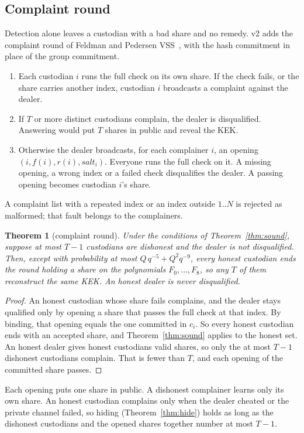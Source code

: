 \documentclass[10pt,a4paper]{article}
\newtheorem{theorem}{Theorem}
\theoremstyle{definition}
\theoremstyle{remark}
\begin{document}
\subsection{Complaint round}\label{sec:complaint}
Detection alone leaves a custodian with a bad share and no remedy. v2 adds the complaint round of Feldman and Pedersen VSS~\cite{feldman,pedersen}, with the hash commitment in place of the group commitment.
\begin{enumerate}
  \item Each custodian $i$ runs the full check on its own share. If the check fails, or the share carries another index, custodian $i$ broadcasts a complaint against the dealer.
  \item If $T$ or more distinct custodians complain, the dealer is disqualified. Answering would put $T$ shares in public and reveal the KEK.
  \item Otherwise the dealer broadcasts, for each complainer $i$, an opening $(i, f(i), r(i), \mathit{salt}_i)$. Everyone runs the full check on it. A missing opening, a wrong index or a failed check disqualifies the dealer. A passing opening becomes custodian $i$'s share.
\end{enumerate}
A complaint list with a repeated index or an index outside $1..N$ is rejected as malformed; that fault belongs to the complainers.

\begin{theorem}[complaint round]\label{thm:complaint}
Under the conditions of Theorem~\ref{thm:sound}, suppose at most $T-1$ custodians are dishonest and the dealer is not disqualified. Then, except with probability at most $Q\,q^{-5} + Q^2 q^{-9}$, every honest custodian ends the round holding a share on the polynomials $F_0,\dots,F_8$, so any $T$ of them reconstruct the same KEK. An honest dealer is never disqualified.
\end{theorem}
\begin{proof}
An honest custodian whose share fails complains, and the dealer stays qualified only by opening a share that passes the full check at that index. By binding, that opening equals the one committed in $c_i$. So every honest custodian ends with an accepted share, and Theorem~\ref{thm:sound} applies to the honest set. An honest dealer gives honest custodians valid shares, so only the at most $T-1$ dishonest custodians complain. That is fewer than $T$, and each opening of the committed share passes.
\end{proof}
Each opening puts one share in public. A dishonest complainer learns only its own share. An honest custodian complains only when the dealer cheated or the private channel failed, so hiding (Theorem~\ref{thm:hide}) holds as long as the dishonest custodians and the opened shares together number at most $T-1$.
\end{document}
